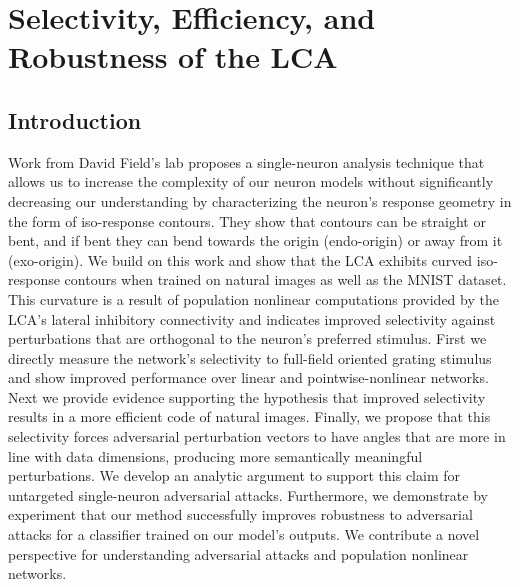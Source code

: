 \chapter{Selectivity, Efficiency, and Robustness of the LCA}

\section{Introduction}
Work from David Field's lab \parencite{golden2016conjectures,vilankar2017selectivity} proposes a single-neuron analysis technique that allows us to increase the complexity of our neuron models without significantly decreasing our understanding by characterizing the neuron’s response geometry in the form of iso-response contours.
They show that contours can be straight or bent, and if bent they can bend towards the origin (endo-origin) or away from it (exo-origin).
We build on this work and show that the LCA exhibits curved iso-response contours when trained on natural images as well as the MNIST dataset.
This curvature is a result of population nonlinear computations provided by the LCA's lateral inhibitory connectivity and indicates improved selectivity against perturbations that are orthogonal to the neuron's preferred stimulus.
First we directly measure the network's selectivity to full-field oriented grating stimulus and show improved performance over linear and pointwise-nonlinear networks.
Next we provide evidence supporting the hypothesis that improved selectivity results in a more efficient code of natural images.
Finally, we propose that this selectivity forces adversarial perturbation vectors to have angles that are more in line with data dimensions, producing more semantically meaningful perturbations.
We develop an analytic argument to support this claim for untargeted single-neuron adversarial attacks.
Furthermore, we demonstrate by experiment that our method successfully improves robustness to adversarial attacks for a classifier trained on our model's outputs.
We contribute a novel perspective for understanding adversarial attacks and population nonlinear networks. 

